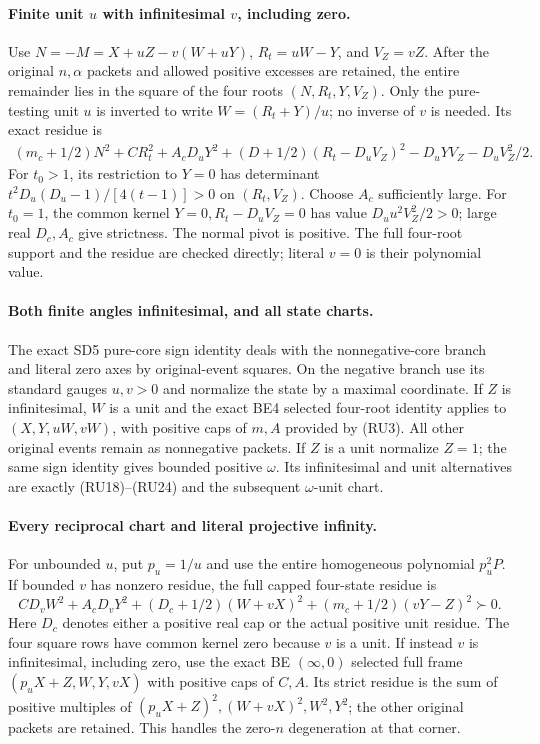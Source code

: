 \paragraph{Finite unit $u$ with infinitesimal $v$, including zero.}
Use $N=-M=X+uZ-v(W+uY)$, $R_t=uW-Y$, and $V_Z=vZ$.
After the original $n,\alpha$ packets and allowed positive excesses
are retained, the entire remainder lies in the square of the four
roots $(N,R_t,Y,V_Z)$. Only the pure-testing unit $u$ is inverted
to write $W=(R_t+Y)/u$; no inverse of $v$ is needed. Its exact
residue is
\[
\begin{aligned}
 (m_c+1/2)N^2+CR_t^2+A_cD_uY^2
 +(D+1/2)(R_t-D_uV_Z)^2-D_uYV_Z-D_uV_Z^2/2.
\end{aligned}                                                     \tag{RU27}
\]
For $t_0>1$, its restriction to $Y=0$ has determinant
$t^2D_u(D_u-1)/[4(t-1)]>0$ on $(R_t,V_Z)$.
Choose $A_c$ sufficiently large. For $t_0=1$, the common kernel
$Y=0,R_t-D_uV_Z=0$ has value $D_uu^2V_Z^2/2>0$;
large real $D_c,A_c$ give strictness. The normal pivot is positive.
The full four-root support and the residue are checked directly;
literal $v=0$ is their polynomial value.

\paragraph{Both finite angles infinitesimal, and all state charts.}
The exact SD5 pure-core sign identity deals with the nonnegative-core
branch and literal zero axes by original-event squares. On the
negative branch use its standard gauges $u,v>0$ and normalize the
state by a maximal coordinate. If $Z$ is infinitesimal, $W$ is a
unit and the exact BE4 selected four-root identity applies to
$(X,Y,uW,vW)$, with positive caps of $m,A$ provided by (RU3).
All other original events remain as nonnegative packets.
If $Z$ is a unit normalize $Z=1$; the same sign identity gives
bounded positive $\omega$. Its infinitesimal and unit alternatives
are exactly (RU18)--(RU24) and the subsequent $\omega$-unit chart.

\paragraph{Every reciprocal chart and literal projective infinity.}
For unbounded $u$, put $p_u=1/u$ and use the entire homogeneous
polynomial $p_u^2P$. If bounded $v$ has nonzero residue, the full
capped four-state residue is
\[
 CD_vW^2+A_cD_vY^2+(D_c+1/2)(W+vX)^2
                          +(m_c+1/2)(vY-Z)^2\succ0.             \tag{RU28}
\]
Here $D_c$ denotes either a positive real cap or the actual positive
unit residue. The four square rows have common kernel zero because
$v$ is a unit. If instead $v$ is infinitesimal, including zero,
use the exact BE $(\infty,0)$ selected full frame
$(p_uX+Z,W,Y,vX)$ with positive caps of $C,A$. Its strict residue
is the sum of positive multiples of
$(p_uX+Z)^2,(W+vX)^2,W^2,Y^2$; the other original packets are
retained. This handles the zero-$n$ degeneration at that corner.

